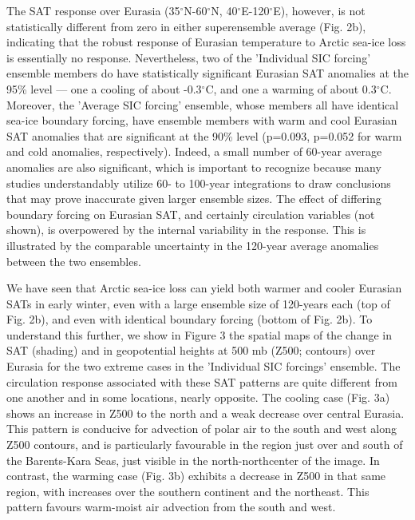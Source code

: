 \documentclass[grl]{AGUTeX}  %
\begin{document}
\begin{article}
The SAT response over Eurasia (35$^\circ$N-60$^\circ$N, 40$^\circ$E-120$^\circ$E), however, is not statistically different from zero in either superensemble average (Fig. 2b), indicating that the robust response of Eurasian temperature to Arctic sea-ice loss is essentially no response. Nevertheless, two of the 'Individual SIC forcing' ensemble members do have statistically significant Eurasian SAT anomalies at the 95\% level --- one a cooling of about -0.3$^\circ$C, and one a warming of about 0.3$^\circ$C. Moreover, the 'Average SIC forcing' ensemble, whose members all have identical sea-ice boundary forcing, have ensemble members with warm and cool Eurasian SAT anomalies that are significant at the 90\% level (p=0.093, p=0.052 for warm and cold anomalies, respectively). Indeed, a small number of 60-year average anomalies are also significant, which is important to recognize because many studies understandably utilize 60- to 100-year integrations to draw conclusions that may prove inaccurate given larger ensemble sizes. The effect of differing boundary forcing on Eurasian SAT, and certainly circulation variables (not shown), is overpowered by the internal variability in the response. This is illustrated by the comparable uncertainty in the 120-year average anomalies between the two ensembles. %

We have seen that Arctic sea-ice loss can yield both warmer and cooler Eurasian SATs in early winter, even with a large ensemble size of 120-years each (top of Fig. 2b), and even with identical boundary forcing (bottom of Fig. 2b). To understand this further, we show in Figure 3 the spatial maps of the change in SAT (shading) and in geopotential heights at 500 mb (Z500; contours) over Eurasia for the two extreme cases in the 'Individual SIC forcings' ensemble. The circulation response associated with these SAT patterns are quite different from one another and in some locations, nearly opposite. The cooling case (Fig. 3a) shows an increase in Z500 to the north and a weak decrease over central Eurasia. This pattern is conducive for advection of polar air to the south and west along Z500 contours, and is particularly favourable in the region just over and south of the Barents-Kara Seas, just visible in the north-northcenter of the image. In contrast, the warming case (Fig. 3b) exhibits a decrease in Z500 in that same region, with increases over the southern continent and the northeast. This pattern favours warm-moist air advection from the south and west. %


\end{article}
\end{document}
